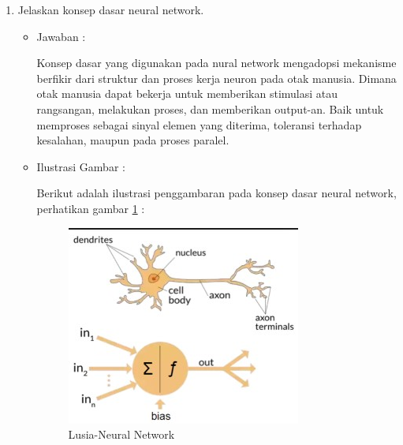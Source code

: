 \begin{enumerate}
\item Jelaskan konsep dasar neural network.
	\begin{itemize}
	\item Jawaban :
		\par Konsep dasar yang digunakan pada nural network mengadopsi mekanisme berfikir dari struktur dan proses kerja neuron pada otak manusia. Dimana otak manusia dapat bekerja untuk memberikan stimulasi atau rangsangan, melakukan proses, dan memberikan output-an. Baik untuk memproses sebagai sinyal elemen yang diterima, toleransi terhadap kesalahan, maupun pada proses paralel.
	\item Ilustrasi Gambar :
		\par Berikut adalah ilustrasi penggambaran pada konsep dasar neural network, perhatikan gambar \ref{6A2} :
		\begin{figure}[!hbtp]
		\centering
		\includegraphics[scale=0.4]{figures/s2.jpg}
		\caption{Lusia-Neural Network}
		\label{6A2}
		\end{figure}
	\end{itemize}
	

\end{enumerate}
